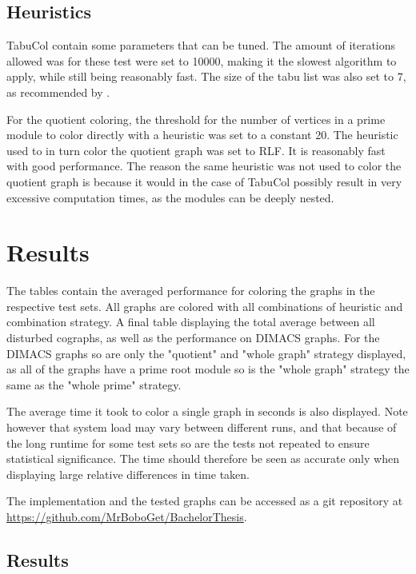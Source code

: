 \documentclass[a4paper]{article}
\begin{document}
\subsection{Heuristics}
TabuCol contain some parameters that can be tuned. The amount of
iterations allowed was for these test were set to 10000, making it the slowest
algorithm to apply, while still being reasonably fast. The size of the tabu list 
was also set to 7, as recommended by \cite{1990}.

For the quotient coloring, the threshold for the number of vertices in a prime
module to color directly with a heuristic was set to a constant 20. The
heuristic used to in turn color the quotient graph was set to RLF. It is
reasonably fast with good performance. The reason the same heuristic was not
used to color the quotient graph is because it would in the case of TabuCol
possibly result in very excessive computation times, as the modules can be
deeply nested.

\section{Results}
\label{sec:Result}

The tables contain the averaged performance for coloring the graphs in the
respective test sets. All graphs are colored with all combinations of heuristic
and combination strategy. A final table displaying the total average between
all disturbed cographs, as well as the performance on DIMACS graphs. For the
DIMACS graphs so are only the "quotient" and "whole graph" strategy displayed,
as all of the graphs have a prime root module so is the "whole graph" strategy
the same as the "whole prime" strategy.

The average time it took to color a single graph in seconds is also displayed. Note
however that system load may vary between different runs, and that because of
the long runtime for some test sets so are the tests not repeated to ensure
statistical significance. The time should therefore be seen as accurate only
when displaying large relative differences in time taken.

The implementation and the tested graphs can be accessed as a git repository 
at \url{https://github.com/MrBoboGet/BachelorThesis}.

\subsection{Results}
\newpage
\end{document}
